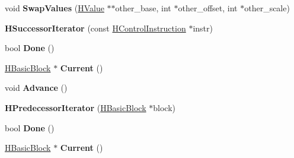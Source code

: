 \begin{DoxyCompactItemize}
\item 
void {\bfseries Swap\+Values} (\hyperlink{classv8_1_1internal_1_1_h_value}{H\+Value} $\ast$$\ast$other\+\_\+base, int $\ast$other\+\_\+offset, int $\ast$other\+\_\+scale)\hypertarget{classv8_1_1internal_1_1_b_a_s_e___e_m_b_e_d_d_e_d_a5b795a7552b77543abaab555d422e82a}{}\label{classv8_1_1internal_1_1_b_a_s_e___e_m_b_e_d_d_e_d_a5b795a7552b77543abaab555d422e82a}

\item 
{\bfseries H\+Successor\+Iterator} (const \hyperlink{classv8_1_1internal_1_1_h_control_instruction}{H\+Control\+Instruction} $\ast$instr)\hypertarget{classv8_1_1internal_1_1_b_a_s_e___e_m_b_e_d_d_e_d_a33ddc9624f8fa6e49295e68b2805d1a5}{}\label{classv8_1_1internal_1_1_b_a_s_e___e_m_b_e_d_d_e_d_a33ddc9624f8fa6e49295e68b2805d1a5}

\item 
bool {\bfseries Done} ()\hypertarget{classv8_1_1internal_1_1_b_a_s_e___e_m_b_e_d_d_e_d_a6751c90815f98147a0742d7974e68eae}{}\label{classv8_1_1internal_1_1_b_a_s_e___e_m_b_e_d_d_e_d_a6751c90815f98147a0742d7974e68eae}

\item 
\hyperlink{classv8_1_1internal_1_1_h_basic_block}{H\+Basic\+Block} $\ast$ {\bfseries Current} ()\hypertarget{classv8_1_1internal_1_1_b_a_s_e___e_m_b_e_d_d_e_d_a7695201cd06ddc4ee259e171fd61ce81}{}\label{classv8_1_1internal_1_1_b_a_s_e___e_m_b_e_d_d_e_d_a7695201cd06ddc4ee259e171fd61ce81}

\item 
void {\bfseries Advance} ()\hypertarget{classv8_1_1internal_1_1_b_a_s_e___e_m_b_e_d_d_e_d_a3d99e222f406f37deb9382e9e370b68a}{}\label{classv8_1_1internal_1_1_b_a_s_e___e_m_b_e_d_d_e_d_a3d99e222f406f37deb9382e9e370b68a}

\item 
{\bfseries H\+Predecessor\+Iterator} (\hyperlink{classv8_1_1internal_1_1_h_basic_block}{H\+Basic\+Block} $\ast$block)\hypertarget{classv8_1_1internal_1_1_b_a_s_e___e_m_b_e_d_d_e_d_abe26f11c4a09318d9086588642459491}{}\label{classv8_1_1internal_1_1_b_a_s_e___e_m_b_e_d_d_e_d_abe26f11c4a09318d9086588642459491}

\item 
bool {\bfseries Done} ()\hypertarget{classv8_1_1internal_1_1_b_a_s_e___e_m_b_e_d_d_e_d_a6751c90815f98147a0742d7974e68eae}{}\label{classv8_1_1internal_1_1_b_a_s_e___e_m_b_e_d_d_e_d_a6751c90815f98147a0742d7974e68eae}

\item 
\hyperlink{classv8_1_1internal_1_1_h_basic_block}{H\+Basic\+Block} $\ast$ {\bfseries Current} ()\hypertarget{classv8_1_1internal_1_1_b_a_s_e___e_m_b_e_d_d_e_d_a7695201cd06ddc4ee259e171fd61ce81}{}\label{classv8_1_1internal_1_1_b_a_s_e___e_m_b_e_d_d_e_d_a7695201cd06ddc4ee259e171fd61ce81}


\end{DoxyCompactItemize}
